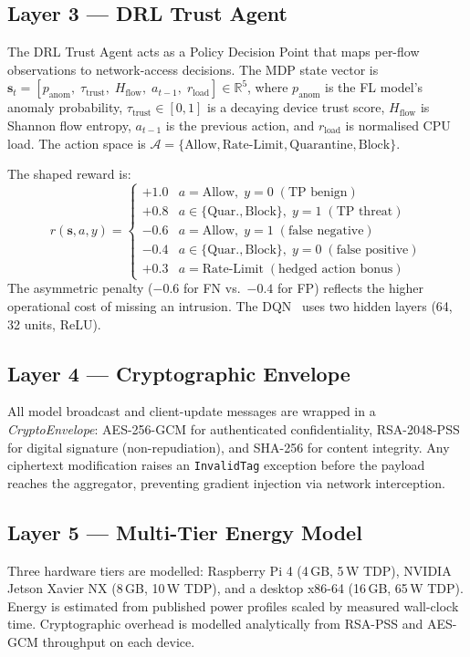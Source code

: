 \documentclass[iicol,sn-mathphys,Numbered]{sn-jnl}
\begin{document}
\subsection{Layer 3 --- DRL Trust Agent}\label{sec:layer3}
The DRL Trust Agent acts as a Policy Decision Point that maps per-flow observations to network-access decisions. The MDP state vector is $\mathbf{s}_t = [p_\text{anom},\;\tau_\text{trust},\;H_\text{flow},\; a_{t-1},\;r_\text{load}] \in \mathbb{R}^5$, where $p_\text{anom}$ is the FL model's anomaly probability, $\tau_\text{trust}\in[0,1]$ is a decaying device trust score, $H_\text{flow}$ is Shannon flow entropy, $a_{t-1}$ is the previous action, and $r_\text{load}$ is normalised CPU load. The action space is $\mathcal{A}=\{\text{Allow},\text{Rate-Limit},\text{Quarantine},\text{Block}\}$.

The shaped reward is:
\begin{equation}
r(\mathbf{s},a,y) =
\begin{cases}
+1.0 & a{=}\text{Allow},\;y{=}0\;(\text{TP benign})\\
+0.8 & a{\in}\{\text{Quar.},\text{Block}\},\;y{=}1\;(\text{TP threat})\\
-0.6 & a{=}\text{Allow},\;y{=}1\;(\text{false negative})\\
-0.4 & a{\in}\{\text{Quar.},\text{Block}\},\;y{=}0\;(\text{false positive})\\
+0.3 & a{=}\text{Rate-Limit}\;(\text{hedged action bonus})
\end{cases}
\label{eq:reward}
\end{equation}
The asymmetric penalty ($-0.6$ for FN vs.\ $-0.4$ for FP) reflects the higher operational cost of missing an intrusion. The DQN~\cite{mnih2015} uses two hidden layers (64, 32 units, ReLU).

\subsection{Layer 4 --- Cryptographic Envelope}\label{sec:layer4}
All model broadcast and client-update messages are wrapped in a \textit{CryptoEnvelope}: AES-256-GCM for authenticated confidentiality, RSA-2048-PSS for digital signature (non-repudiation), and SHA-256 for content integrity. Any ciphertext modification raises an \texttt{InvalidTag} exception before the payload reaches the aggregator, preventing gradient injection via network interception.

\subsection{Layer 5 --- Multi-Tier Energy Model}\label{sec:layer5}
Three hardware tiers are modelled: Raspberry Pi 4 (4\,GB, 5\,W TDP), NVIDIA Jetson Xavier NX (8\,GB, 10\,W TDP), and a desktop x86-64 (16\,GB, 65\,W TDP). Energy is estimated from published power profiles scaled by measured wall-clock time. Cryptographic overhead is modelled analytically from RSA-PSS and AES-GCM throughput on each device.
\end{document}
